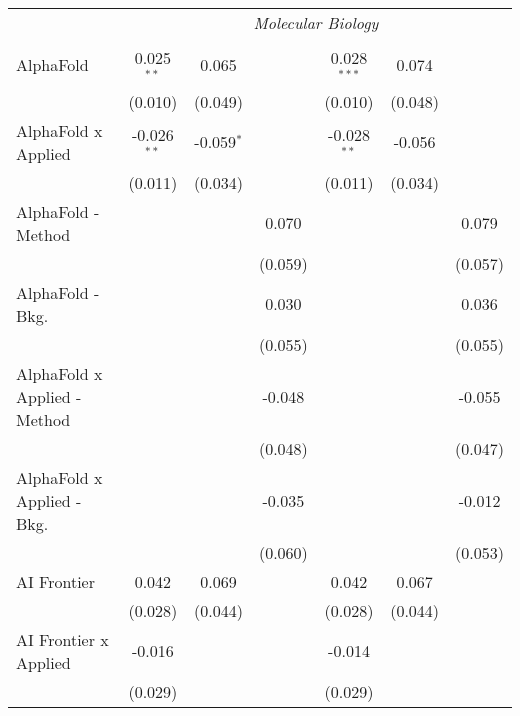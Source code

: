 \begin{tabular}{lcccccc}
 & \multicolumn{6}{c}{\textit{Molecular Biology}} \\ \\
   AlphaFold                    & 0.025$^{**}$  & 0.065        &         & 0.028$^{***}$ & 0.074       &   \\   
                                & (0.010)       & (0.049)      &         & (0.010)       & (0.048)     &   \\   
   AlphaFold x Applied          & -0.026$^{**}$ & -0.059$^{*}$ &         & -0.028$^{**}$ & -0.056      &   \\   
                                & (0.011)       & (0.034)      &         & (0.011)       & (0.034)     &   \\   
   AlphaFold - Method           &               &              & 0.070   &               &             & 0.079\\   
                                &               &              & (0.059) &               &             & (0.057)\\   
   AlphaFold - Bkg.             &               &              & 0.030   &               &             & 0.036\\   
                                &               &              & (0.055) &               &             & (0.055)\\   
   AlphaFold x Applied - Method &               &              & -0.048  &               &             & -0.055\\   
                                &               &              & (0.048) &               &             & (0.047)\\   
   AlphaFold x Applied - Bkg.   &               &              & -0.035  &               &             & -0.012\\   
                                &               &              & (0.060) &               &             & (0.053)\\   
   AI Frontier                  & 0.042         & 0.069        &         & 0.042         & 0.067       &   \\   
                                & (0.028)       & (0.044)      &         & (0.028)       & (0.044)     &   \\   
   AI Frontier x Applied        & -0.016        &              &         & -0.014        &             &   \\   
                                & (0.029)       &              &         & (0.029)       &             &   \\   

\end{tabular}
